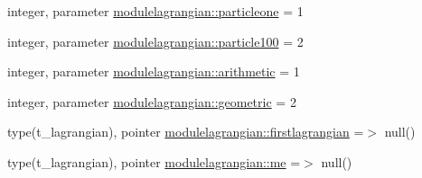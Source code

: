 \begin{DoxyCompactItemize}
\item 
integer, parameter \mbox{\hyperlink{namespacemodulelagrangian_aa279e8989c6581fe1312a3f9cd4fdeac}{modulelagrangian\+::particleone}} = 1
\item 
integer, parameter \mbox{\hyperlink{namespacemodulelagrangian_a4209a9cf5465c700edfc376d2588592a}{modulelagrangian\+::particle100}} = 2
\item 
integer, parameter \mbox{\hyperlink{namespacemodulelagrangian_ad75e0a9327fd989cf7acd4437fa3137c}{modulelagrangian\+::arithmetic}} = 1
\item 
integer, parameter \mbox{\hyperlink{namespacemodulelagrangian_a86208fa362b76783d45667092ee2cea3}{modulelagrangian\+::geometric}} = 2
\item 
type(t\+\_\+lagrangian), pointer \mbox{\hyperlink{namespacemodulelagrangian_ac7d5cb68e1a2883f07092692f7910881}{modulelagrangian\+::firstlagrangian}} =$>$ null()
\item 
type(t\+\_\+lagrangian), pointer \mbox{\hyperlink{namespacemodulelagrangian_a0d1f6dbfbdcf2bc06e8813a1cbfc6bc9}{modulelagrangian\+::me}} =$>$ null()
\end{DoxyCompactItemize}
